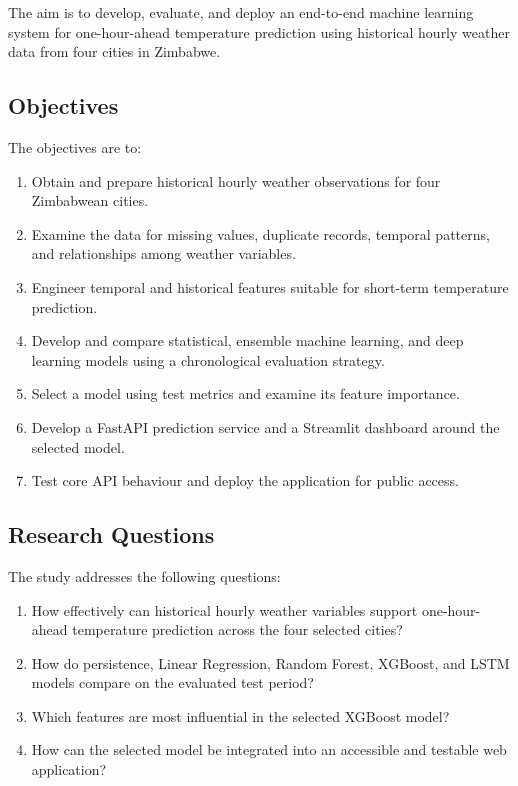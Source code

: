 \documentclass[12pt,a4paper]{article}
\begin{document}
	The aim is to develop, evaluate, and deploy an end-to-end machine
	learning system for one-hour-ahead temperature prediction using
	historical hourly weather data from four cities in Zimbabwe.
	
	\subsection{Objectives}
	
	The objectives are to:
	\begin{enumerate}[leftmargin=*]
		\item Obtain and prepare historical hourly weather observations
		for four Zimbabwean cities.
		\item Examine the data for missing values, duplicate records,
		temporal patterns, and relationships among weather variables.
		\item Engineer temporal and historical features suitable for
		short-term temperature prediction.
		\item Develop and compare statistical, ensemble machine learning,
		and deep learning models using a chronological evaluation strategy.
		\item Select a model using test metrics and examine its feature
		importance.
		\item Develop a FastAPI prediction service and a Streamlit
		dashboard around the selected model.
		\item Test core API behaviour and deploy the application for
		public access.
	\end{enumerate}
	
	\subsection{Research Questions}
	
	The study addresses the following questions:
	\begin{enumerate}[leftmargin=*]
		\item How effectively can historical hourly weather variables
		support one-hour-ahead temperature prediction across the four
		selected cities?
		\item How do persistence, Linear Regression, Random Forest,
		XGBoost, and LSTM models compare on the evaluated test period?
		\item Which features are most influential in the selected
		XGBoost model?
		\item How can the selected model be integrated into an accessible
		and testable web application?
	\end{enumerate}
	
\end{document}
